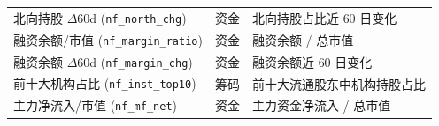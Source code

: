 \documentclass[UTF8, a4paper, fontset=none, zihao=-4]{ctexrep}
\begin{document}
\begin{longtable}{@{}>{\raggedright\arraybackslash}p{3.9cm}>{\raggedright\arraybackslash}p{2.0cm}>{\raggedright\arraybackslash}p{8.5cm}@{}}
北向持股 $\Delta$60d (\texttt{\scriptsize nf\_north\_chg}) & 资金 & 北向持股占比近 $60$ 日变化 \\
融资余额/市值 (\texttt{\scriptsize nf\_margin\_ratio}) & 资金 & 融资余额 / 总市值 \\
融资余额 $\Delta$60d (\texttt{\scriptsize nf\_margin\_chg}) & 资金 & 融资余额近 $60$ 日变化 \\
前十大机构占比 (\texttt{\scriptsize nf\_inst\_top10}) & 筹码 & 前十大流通股东中机构持股占比 \\
主力净流入/市值 (\texttt{\scriptsize nf\_mf\_net}) & 资金 & 主力资金净流入 / 总市值 \\
\end{longtable}
\normalsize
\end{document}
